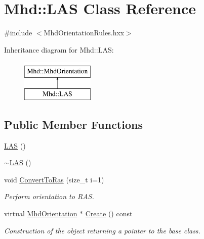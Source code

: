 \hypertarget{classMhd_1_1LAS}{\section{\-Mhd\-:\-:\-L\-A\-S \-Class \-Reference}
\label{classMhd_1_1LAS}
}


{\ttfamily \#include $<$\-Mhd\-Orientation\-Rules.\-hxx$>$}

\-Inheritance diagram for \-Mhd\-:\-:\-L\-A\-S\-:\begin{figure}[H]
\begin{center}
\leavevmode
\includegraphics[height=2.000000cm]{classMhd_1_1LAS}
\end{center}
\end{figure}
\subsection*{\-Public \-Member \-Functions}
\begin{DoxyCompactItemize}
\item 
\hyperlink{classMhd_1_1LAS_adb0ce802ddc32f751b84c0df795f25d8}{\-L\-A\-S} ()
\item 
\hyperlink{classMhd_1_1LAS_ad48ced5d6256eb9f9aaea52831446eff}{$\sim$\-L\-A\-S} ()
\item 
void \hyperlink{classMhd_1_1LAS_a4f13f477cd458018b3953ba1f35362d8}{\-Convert\-To\-Ras} (size\-\_\-t i=1)
\begin{DoxyCompactList}\small\item\em \-Perform orientation to \-R\-A\-S. \end{DoxyCompactList}\item 
virtual \hyperlink{classMhd_1_1MhdOrientation}{\-Mhd\-Orientation} $\ast$ \hyperlink{classMhd_1_1LAS_a6c26a5b3acadce4f71fd91e64fb1406b}{\-Create} () const 
\begin{DoxyCompactList}\small\item\em \-Construction of the object returning a pointer to the base class. \end{DoxyCompactList}\end{DoxyCompactItemize}


